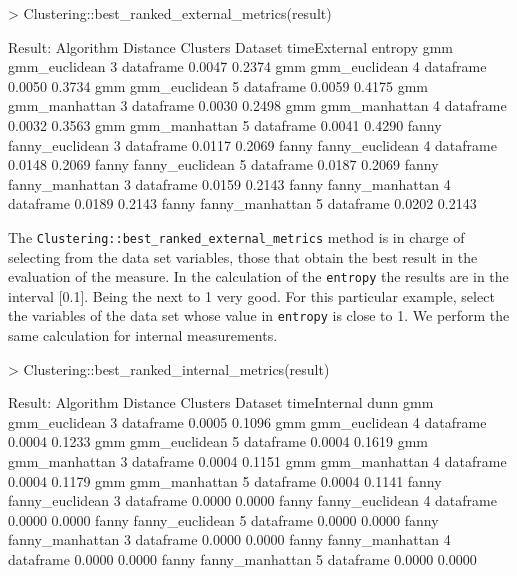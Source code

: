\begin{Schunk}
\begin{Sinput}
> Clustering::best_ranked_external_metrics(result)
\end{Sinput}
\begin{Soutput}
Result:
Algorithm  Distance         Clusters   Dataset  timeExternal entropy
  gmm        gmm_euclidean     3      dataframe    0.0047    0.2374
  gmm        gmm_euclidean     4      dataframe    0.0050    0.3734
  gmm        gmm_euclidean     5      dataframe    0.0059    0.4175
  gmm        gmm_manhattan     3      dataframe    0.0030    0.2498
  gmm        gmm_manhattan     4      dataframe    0.0032    0.3563
  gmm        gmm_manhattan     5      dataframe    0.0041    0.4290
fanny      fanny_euclidean     3      dataframe    0.0117    0.2069
fanny      fanny_euclidean     4      dataframe    0.0148    0.2069
fanny      fanny_euclidean     5      dataframe    0.0187    0.2069
fanny      fanny_manhattan     3      dataframe    0.0159    0.2143
fanny      fanny_manhattan     4      dataframe    0.0189    0.2143
fanny      fanny_manhattan     5      dataframe    0.0202    0.2143
\end{Soutput}
\end{Schunk}

The \texttt{Clustering::best\_ranked\_external\_metrics} method is in charge of selecting from the data set variables, those that obtain the best result in the evaluation of the measure. In the calculation of the \texttt{entropy} the results are in the interval [0.1]. Being the next to 1 very good. For this particular example, select the variables of the data set whose value in \texttt{entropy} is close to 1. We perform the same calculation for internal measurements.

\begin{Schunk}
\begin{Sinput}
> Clustering::best_ranked_internal_metrics(result)
\end{Sinput}
\begin{Soutput}
Result:
Algorithm      Distance     Clusters   Dataset  timeInternal   dunn
   gmm       gmm_euclidean     3      dataframe   0.0005      0.1096
   gmm       gmm_euclidean     4      dataframe   0.0004      0.1233
   gmm       gmm_euclidean     5      dataframe   0.0004      0.1619
   gmm       gmm_manhattan     3      dataframe   0.0004      0.1151
   gmm       gmm_manhattan     4      dataframe   0.0004      0.1179
   gmm       gmm_manhattan     5      dataframe   0.0004      0.1141
 fanny     fanny_euclidean     3      dataframe   0.0000      0.0000
 fanny     fanny_euclidean     4      dataframe   0.0000      0.0000
 fanny     fanny_euclidean     5      dataframe   0.0000      0.0000
 fanny     fanny_manhattan     3      dataframe   0.0000      0.0000
 fanny     fanny_manhattan     4      dataframe   0.0000      0.0000
 fanny     fanny_manhattan     5      dataframe   0.0000      0.0000
\end{Soutput}
\end{Schunk}

